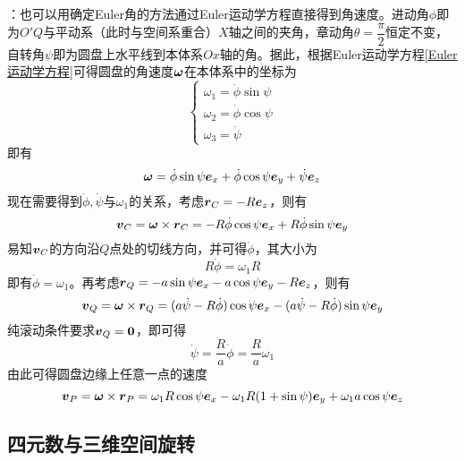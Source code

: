 \begin{solution}
：也可以用确定Euler角的方法通过Euler运动学方程直接得到角速度。进动角$\phi$即为$O'Q$与平动系（此时与空间系重合）$X$轴之间的夹角，章动角$\theta = \dfrac{\pi}{2}$恒定不变，自转角$\psi$即为圆盘上水平线到本体系$Ox$轴的角。据此，根据Euler运动学方程\eqref{Euler运动学方程}可得圆盘的角速度$\boldsymbol{\omega}$在本体系中的坐标为
\begin{equation*}
	\begin{cases}
		\omega_1 = \dot{\phi} \sin \psi \\
		\omega_2 = \dot{\phi} \cos \psi \\
		\omega_3 = \dot{\psi}
	\end{cases}
\end{equation*}
即有
\begin{equation*}
	\boldsymbol{\omega} = \dot{\phi} \sin \psi \boldsymbol{e}_x + \dot{\phi} \cos \psi \boldsymbol{e}_y + \dot{\psi} \boldsymbol{e}_z
\end{equation*}
现在需要得到$\dot{\phi},\dot{\psi}$与$\omega_1$的关系，考虑$\boldsymbol{r}_C = -R\boldsymbol{e}_z$，则有
\begin{equation*}
	\boldsymbol{v}_C = \boldsymbol{\omega} \times \boldsymbol{r}_C = -R\dot{\phi} \cos \psi \boldsymbol{e}_x + R\dot{\phi} \sin \psi \boldsymbol{e}_y
\end{equation*}
易知$\boldsymbol{v}_C$的方向沿$Q$点处的切线方向，并可得$\dot{\phi}$，其大小为
\begin{equation*}
	R\dot{\phi} = \omega_1 R
\end{equation*}
即有$\dot{\phi} = \omega_1$。再考虑$\boldsymbol{r}_Q = -a\sin \psi \boldsymbol{e}_x - a\cos \psi \boldsymbol{e}_y - R\boldsymbol{e}_z$，则有
\begin{equation*}
	\boldsymbol{v}_Q = \boldsymbol{\omega} \times \boldsymbol{r}_Q = (a\dot{\psi}-R\dot{\phi}) \cos \psi \boldsymbol{e}_x - (a\dot{\psi}-R\dot{\phi}) \sin \psi \boldsymbol{e}_y
\end{equation*}
纯滚动条件要求$\boldsymbol{v}_Q = \boldsymbol{0}$，即可得
\begin{equation*}
	\dot{\psi} = \frac{R}{a} \dot{\phi} = \frac{R}{a} \omega_1
\end{equation*}
由此可得圆盘边缘上任意一点的速度
\begin{equation*}
	\boldsymbol{v}_P = \boldsymbol{\omega} \times \boldsymbol{r}_P = \omega_1 R \cos \psi \boldsymbol{e}_x - \omega_1 R(1+\sin \psi) \boldsymbol{e}_y + \omega_1 a \cos \psi \boldsymbol{e}_z
\end{equation*}
\end{solution}

\subsection{四元数与三维空间旋转}

